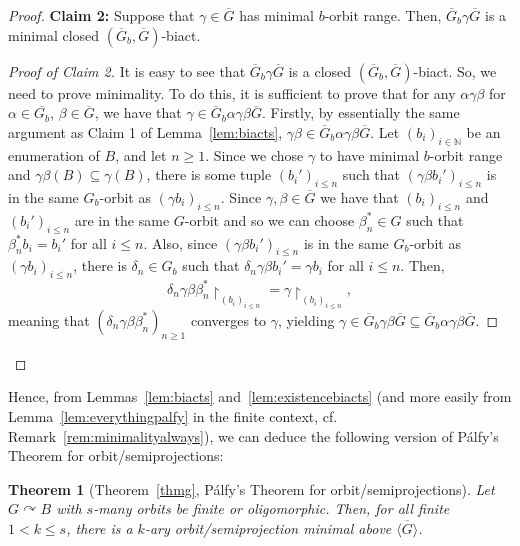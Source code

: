 \documentclass{article}
\newtheorem{theorem}{Theorem}[section]
\theoremstyle{remark}
\theoremstyle{definition}
\def\acts{\curvearrowright}
\begin{document}
\begin{proof}
\textbf{Claim 2:} Suppose that $\gamma\in\overline{G}$ has minimal $b$-orbit range. Then, $\overline{G}_b\gamma\overline{G}$ is a minimal closed $(\overline{G}_b, \overline{G})$-biact. 
\begin{proof}[Proof of Claim 2] It is easy to see that $\overline{G}_b\gamma\overline{G}$ is a closed $(\overline{G}_b, \overline{G})$-biact. So, we need to prove minimality. To do this, it is sufficient to prove that for any $\alpha\gamma\beta$ for $\alpha\in\overline{G_b}$, $\beta\in\overline{G}$, we have that $\gamma\in\overline{G}_b\alpha\gamma\beta \overline{G}$. Firstly, by essentially the same argument as Claim 1 of Lemma~\ref{lem:biacts}, $\gamma\beta\in \overline{G}_b\alpha\gamma\beta \overline{G}$. Let $(b_i)_{i\in\mathbb{N}}$ be an enumeration of $B$, {and let $n\geq 1$}. Since we chose $\gamma$ to have minimal $b$-orbit range and $\gamma\beta(B)\subseteq\gamma(B)$, %
 there is some tuple $(b_i')_{i\leq n}$ such that $(\gamma \beta b_i')_{i\leq n}$ is in the same $G_b$-orbit as $(\gamma b_i)_{i\leq n}$.  {Since $\gamma,\beta\in\overline{G}$ {we have that} $(b_i)_{i\leq n}$ and $(b_i')_{i\leq n}$ are in the same $G$-orbit and so we can choose $\beta^*_n\in G$ such that $\beta_n^*b_i=b_i'$ for all $i\leq n$.} Also, since $(\gamma \beta b_i')_{i\leq n}$ is in the same $G_b$-orbit as $(\gamma b_i)_{i\leq n}$, there is $\delta_n\in G_b$ such that  $\delta_n\gamma\beta b_i'=\gamma b_i$ for all $i\leq n$. %
{Then,} 
    \[{\delta_n\gamma\beta\beta^*_n}\upharpoonright_{(b_i)_{i\leq n}}= \gamma \upharpoonright_{(b_i)_{i\leq n}},\]
    meaning that {$(\delta_n\gamma\beta\beta^*_n)_{n\geq 1}$ } converges to $\gamma$, yielding $\gamma\in\overline{G}_b\gamma\beta\overline{G}\subseteq \overline{G}_b\alpha\gamma\beta\overline{G}$.
\end{proof}
\end{proof}

Hence, from Lemmas~\ref{lem:biacts} and~\ref{lem:existencebiacts} (and more easily from Lemma~\ref{lem:everythingpalfy} in the finite context, cf. Remark~\ref{rem:minimalityalways}), we can deduce the following version of P\'{a}lfy's Theorem for orbit\-/semiprojections:


\begin{theorem}[Theorem~\ref{thmg}, P\'{a}lfy's Theorem for orbit\-/semiprojections]\label{thm:Palfy} Let $G\acts B$ with $s$-many orbits be finite or oligomorphic. Then, for all finite $1<k\leq s$, there is a $k$-ary orbit\-/semiprojection minimal above $\overline{\langle G\rangle}$.
\end{theorem}
\end{document}
